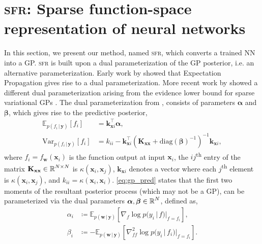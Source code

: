\documentclass{article}
\renewcommand{\paragraph}[1]{{\bf #1}~~}
\newcommand{\our}{\textsc{sfr}\xspace}
\newcommand{\mathbold}[1]{\bm{#1}}
\newcommand{\mbf}[1]{\mathbf{#1}}
\renewcommand{\mid}{\,|\,}
\newcommand{\valpha}[0]{\mathbold{\alpha}}
\newcommand{\vbeta}[0]{\mathbold{\beta}}
\newcommand{\diag}{\text{{diag}}}
\newcommand{\vx}{\mbf{x}}
\newcommand{\vy}{\mbf{y}}
\newcommand{\vw}{\mbf{w}}
\newcommand{\MKxx}{\mbf{K}_{\mbf{x}\mbf{x}}}
\newcommand{\vk}{\mbf{k}}
\newcommand{\myexpect}{\mathbb{E}}
\begin{document}
\section{\our: Sparse function-space representation of neural networks}\label{sec:sfr}
In this section, we present our method, named \our, which converts a trained NN into a GP.
\our is built upon a dual parameterization of the GP posterior, i.e. an alternative parameterization.
Early work by \citet{csato2002sparse} showed that Expectation Propagation gives rise to a dual parameterization.
More recent work by \citet{adam2021dual,chang2023memory} showed a different dual parameterization arising from the evidence lower bound for sparse variational GPs \citep{hensman2013gaussian,titsias2009variational}.
The dual parameterization from \citet{adam2021dual,chang2023memory}, consists of parameters $\valpha$ and $\vbeta$, which gives rise to the predictive posterior,
\begin{align}  \label{eq:gp_pred}
  \myexpect_{p(f_i \mid\vy)}[f_i] &= \vk_{\vx i}^\top \valpha, \\
  \mathrm{Var}_{p(f_i \mid \vy)}[f_i] &= k_{ii} - \vk_{\vx i}^\top ( \MKxx + \diag(\vbeta)^{-1})^{-1} \vk_{\vx i}, \nonumber
\end{align}
%
where $f_i = f_\vw(\vx_i)$ is the function output at input $\vx_i$,
the $ij$\textsuperscript{th} entry of the matrix $\MKxx \in \R^{N \times N}$ is $\kappa(\vx_i,\vx_j)$, $\vk_{\vx i}$ denotes a vector where each $j$\textsuperscript{th} element is $\kappa(\vx_i, \vx_j)$, and $k_{ii} = \kappa(\vx_i, \vx_i)$.
\cref{eq:gp_pred} states that the first two moments of the resultant posterior process (which may not be a GP), can be parameterized via the dual
parameters $\valpha, \vbeta \in \R^{N}$,
defined as, 
%
\begin{equation}
\begin{split}
  \label{eq:dual_param}
  \alpha_i &\coloneqq \myexpect_{p(\vw \mid \vy)}[\nabla_{f}\log p(y_i \mid f) |_{f=f_i}], \\
  \beta_i &\coloneqq - \myexpect_{p(\vw \mid \vy)}[\nabla^2_{f f}\log p(y_i \mid f_i) |_{f=f_i}].
  \end{split}
\end{equation}
\end{document}
